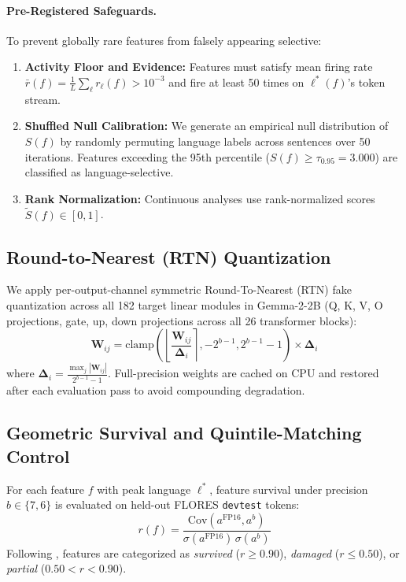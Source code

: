 \documentclass[11pt]{article}
\begin{document}
\paragraph{Pre-Registered Safeguards.}
To prevent globally rare features from falsely appearing selective:
\begin{enumerate}
    \item \textbf{Activity Floor and Evidence:} Features must satisfy mean firing rate $\bar{r}(f) = \frac{1}{L}\sum_\ell r_\ell(f) > 10^{-3}$ and fire at least 50 times on $\ell^*(f)$'s token stream.
    \item \textbf{Shuffled Null Calibration:} We generate an empirical null distribution of $S(f)$ by randomly permuting language labels across sentences over 50 iterations. Features exceeding the 95th percentile ($S(f) \ge \tau_{0.95} = 3.000$) are classified as language-selective.
    \item \textbf{Rank Normalization:} Continuous analyses use rank-normalized scores $\tilde{S}(f) \in [0, 1]$.
\end{enumerate}

\subsection{Round-to-Nearest (RTN) Quantization}
We apply per-output-channel symmetric Round-To-Nearest (RTN) fake quantization across all 182 target linear modules in Gemma-2-2B (Q, K, V, O projections, gate, up, down projections across all 26 transformer blocks):
\begin{equation}
\hat{\mathbf{W}}_{ij} = \text{clamp}\left(\left\lfloor \frac{\mathbf{W}_{ij}}{\mathbf{\Delta}_i} \right\rceil, -2^{b-1}, 2^{b-1}-1\right) \times \mathbf{\Delta}_i
\end{equation}
where $\mathbf{\Delta}_i = \frac{\max_j |\mathbf{W}_{ij}|}{2^{b-1}-1}$. Full-precision weights are cached on CPU and restored after each evaluation pass to avoid compounding degradation.

\subsection{Geometric Survival and Quintile-Matching Control}
For each feature $f$ with peak language $\ell^*$, feature survival under precision $b \in \{7, 6\}$ is evaluated on held-out FLORES \texttt{devtest} tokens:
\begin{equation}
\label{eq:pearson}
r(f) = \frac{\mathrm{Cov}(a^{\text{FP16}}, a^b)}{\sigma(a^{\text{FP16}})\,\sigma(a^b)}
\end{equation}
Following \citet{duan2026perplexity}, features are categorized as \emph{survived} ($r \ge 0.90$), \emph{damaged} ($r \le 0.50$), or \emph{partial} ($0.50 < r < 0.90$).
\end{document}

